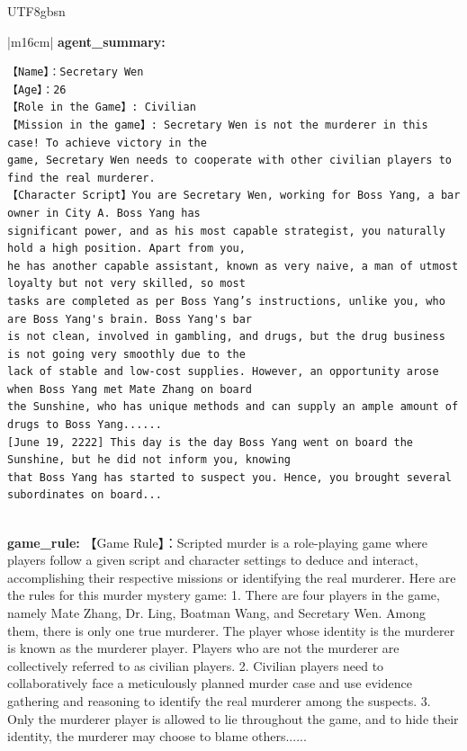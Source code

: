 \documentclass[11pt]{article}
\begin{document}
{\begin{CJK}{UTF8}{gbsn}
\begin{table}[ht!]
\begin{minipage}[t]{\linewidth}
\begin{tabular}{|m{16cm}|}
 \textbf{  agent\_summary:}\\
 \begin{minipage}[t]{\linewidth}
\small\begin{verbatim}
【Name】：Secretary Wen
【Age】：26
【Role in the Game】: Civilian
【Mission in the game】: Secretary Wen is not the murderer in this case! To achieve victory in the
game, Secretary Wen needs to cooperate with other civilian players to find the real murderer.
【Character Script】You are Secretary Wen, working for Boss Yang, a bar owner in City A. Boss Yang has 
significant power, and as his most capable strategist, you naturally hold a high position. Apart from you, 
he has another capable assistant, known as very naive, a man of utmost loyalty but not very skilled, so most 
tasks are completed as per Boss Yang’s instructions, unlike you, who are Boss Yang's brain. Boss Yang's bar 
is not clean, involved in gambling, and drugs, but the drug business is not going very smoothly due to the 
lack of stable and low-cost supplies. However, an opportunity arose when Boss Yang met Mate Zhang on board
the Sunshine, who has unique methods and can supply an ample amount of drugs to Boss Yang......
[June 19, 2222] This day is the day Boss Yang went on board the Sunshine, but he did not inform you, knowing
that Boss Yang has started to suspect you. Hence, you brought several subordinates on board...
\end{verbatim} 
\end{minipage} \\

 \textbf{   game\_rule:} \small【Game Rule】：Scripted murder is a role-playing game where players follow a given script and character settings to deduce and interact, accomplishing their respective missions or identifying the real murderer. Here are the rules for this murder mystery game: 1. There are four players in the game, namely Mate Zhang, Dr. Ling, Boatman Wang, and Secretary Wen. Among them, there is only one true murderer. The player whose identity is the murderer is known as the murderer player. Players who are not the murderer are collectively referred to as civilian players. 2. Civilian players need to collaboratively face a meticulously planned murder case and use evidence gathering and reasoning to identify the real murderer among the suspects. 3. Only the murderer player is allowed to lie throughout the game, and to hide their identity, the murderer may choose to blame others......\\


\end{tabular}
\end{minipage}
\end{table}
\end{CJK}}
\end{document}
